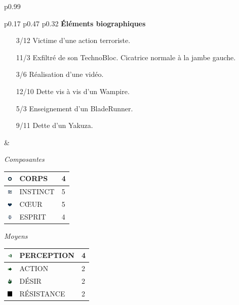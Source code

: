 \documentclass[11pt,twoside,a4paper]{article}
\def\imgCORPS{\includegraphics[width=0.25cm]{../../../../../imgGraphics/rolePlayingGame/SimulacreS/mini12x12/corps.png} }
\def\imgINSTI{\includegraphics[width=0.25cm]{../../../../../imgGraphics/rolePlayingGame/SimulacreS/mini12x12/instinct.png} }
\def\imgCOEUR{\includegraphics[width=0.25cm]{../../../../../imgGraphics/rolePlayingGame/SimulacreS/mini12x12/coeur.png} }
\def\imgESPRI{\includegraphics[width=0.25cm]{../../../../../imgGraphics/rolePlayingGame/SimulacreS/mini12x12/esprit.png} }
\def\imgPERCE{\includegraphics[width=0.25cm]{../../../../../imgGraphics/rolePlayingGame/SimulacreS/mini12x12/perception.png} }
\def\imgACTIO{\includegraphics[width=0.25cm]{../../../../../imgGraphics/rolePlayingGame/SimulacreS/mini12x12/action.png} }
\def\imgDESIR{\includegraphics[width=0.25cm]{../../../../../imgGraphics/rolePlayingGame/SimulacreS/mini12x12/desir.png} }
\def\imgRESIS{\includegraphics[width=0.25cm]{../../../../../imgGraphics/rolePlayingGame/SimulacreS/mini12x12/resistance.png} }
\begin{document}
\begin{longtable}[ht]{ p{} }
\begin{tabular}[h]{ p{} p{} p{} }
		\textbf{{\'E}l{\'e}ments biographiques}
		\begin{itemize}
			\item[3/12] Victime d'une action terroriste. 
			\item[11/3] Exfiltr{\'e} de son TechnoBloc. Cicatrice normale {\`a} la jambe gauche. 
			\item[3/6] R{\'e}alisation d'une vid{\'e}o. 
			\item[12/10] Dette vis {\`a} vis d'un Wampire. 
			\item[5/3] Enseignement d'un BladeRunner. 
			\item[9/11] Dette d'un Yakuza. 
		\end{itemize}
		
		& %
		
			{\centering \emph{Composantes}}	\newline
				{\footnotesize %
				\begin{tabular}[h]{|p{0.25cm}|p{3.00cm}|p{0.75cm}|}
					\hline
					\imgCORPS & CORPS		&	4	\\
					\hline
					\imgINSTI & INSTINCT	&	5	\\
					\hline
					\imgCOEUR & C\OE UR		&	5	\\
					\hline
					\imgESPRI & ESPRIT		&	4	\\
					\hline
				\end{tabular} }
			\newline
			
			{\centering \emph{Moyens}} \newline
				{\footnotesize %
				\begin{tabular}[h]{|p{0.25cm}|p{3.00cm}|p{0.75cm}|}
					\hline
					\imgPERCE &  PERCEPTION		 & 4 \\
					\hline
					\imgACTIO &  ACTION			 & 2 \\
					\hline
					\imgDESIR &  D{\'E}SIR		 & 2 \\
					\hline
					\imgRESIS &  R{\'E}SISTANCE	 & 2 \\
					\hline
				\end{tabular} }
			\newline
			

\end{tabular}
\end{longtable}
\end{document}
